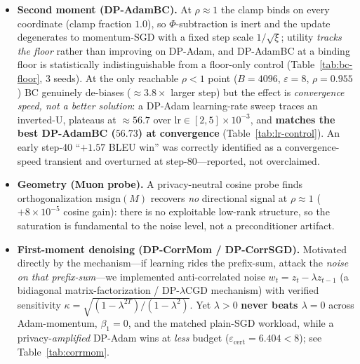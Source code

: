 \documentclass[11pt]{article}
\theoremstyle{plain}
\theoremstyle{definition}
\theoremstyle{remark}
\begin{document}
\begin{itemize}[leftmargin=1.4em,itemsep=2pt,topsep=2pt]
\item \textbf{Second moment (DP-AdamBC).} At $\rho\approx1$ the clamp binds on every coordinate
(clamp fraction $1.0$), so $\Phi$-subtraction is inert and the update degenerates to
momentum-SGD with a fixed step scale $1/\sqrt{\xi}$; utility \emph{tracks the floor} rather than
improving on DP-Adam, and DP-AdamBC at a binding floor is statistically indistinguishable from a
floor-only control (Table~\ref{tab:bc-floor}, 3 seeds). At the only reachable $\rho<1$ point
($B{=}4096$, $\varepsilon{=}8$, $\rho{=}0.955$) BC genuinely de-biases ($\approx3.8\times$ larger
step) but the effect is \emph{convergence speed, not a better solution}: a DP-Adam learning-rate
sweep traces an inverted-U, plateaus at $\approx56.7$ over $\mathrm{lr}\in[2,5]\times10^{-3}$, and
\textbf{matches the best DP-AdamBC ($56.73$) at convergence} (Table~\ref{tab:lr-control}). An
early step-40 ``$+1.57$ BLEU win'' was correctly identified as a convergence-speed transient and
overturned at step-80---reported, not overclaimed.
\item \textbf{Geometry (Muon probe).} A privacy-neutral cosine probe finds orthogonalization
$\mathrm{msign}(M)$ recovers \emph{no} directional signal at $\rho\approx1$ ($+8\times10^{-5}$
cosine gain): there is no exploitable low-rank structure, so the saturation is fundamental to the
noise level, not a preconditioner artifact.
\item \textbf{First-moment denoising (DP-CorrMom / DP-CorrSGD).} Motivated directly by the
mechanism---if learning rides the prefix-sum, attack the \emph{noise on that prefix-sum}---we
implemented anti-correlated noise $w_t=z_t-\lambda z_{t-1}$ (a bidiagonal matrix-factorization /
DP-$\lambda$CGD mechanism) with verified sensitivity $\kappa=\sqrt{(1-\lambda^{2T})/(1-\lambda^2)}$.
Yet $\lambda>0$ \textbf{never beats $\lambda=0$} across Adam-momentum, $\beta_1{=}0$, and the
matched plain-SGD workload, while a privacy-\emph{amplified} DP-Adam wins at \emph{less} budget
($\varepsilon_{\mathrm{cert}}{=}6.404<8$); see Table~\ref{tab:corrmom}.
\end{itemize}
\end{document}
